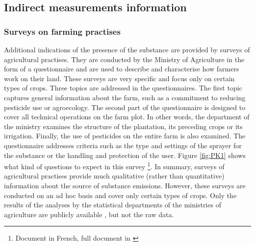 
\subsection{Indirect measurements information}

\subsubsection{Surveys on farming practises}

Additional indications of the presence of the substance are provided by surveys of agricultural practises. They are conducted by the Ministry of Agriculture in the form of a questionnaire and are used to describe and characterise how farmers work on their land. These surveys are very specific and focus only on certain types of crops. Three topics are addressed in the questionnaires. The first topic captures general information about the farm, such as a commitment to reducing pesticide use or agroecology. The second part of the questionnaire is designed to cover all technical operations on the farm plot. In other words, the department of the ministry examines the structure of the plantation, its preceding crops or its irrigation. Finally, the use of pesticides on the entire farm is also examined. The questionnaire addresses criteria such as the type and settings of the sprayer for the substance or the handling and protection of the user.
Figure \ref{fig:PK1} shows what kind of questions to expect in this survey \footnote{Document in French, full document in \cite{PK}}. In summary, surveys of agricultural practises provide much qualitative (rather than quantitative) information about the source of substance emissions. However, these surveys are conducted on an ad hoc basis and cover only certain types of crops. Only the results of the analyses by the statistical departments of the ministries of agriculture are publicly available \citep{PK2}, but not the raw data.

